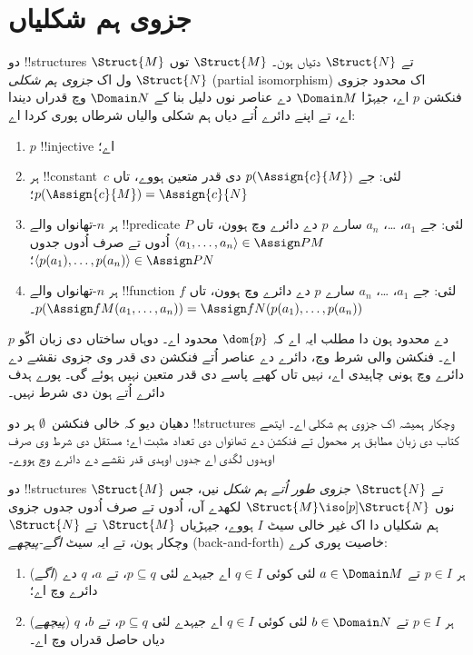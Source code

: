 \documentclass[../../../include/open-logic-section]{subfiles}
\begin{document}
\section{جزوی ہم شکلیاں}

\begin{defn}
  دو !!{structure}s $\Struct{M}$ تے $\Struct{N}$ دتیاں ہون۔
  $\Struct{M}$ توں $\Struct{N}$ ول اک \emph{جزوی ہم شکلی}
  (partial isomorphism) اک محدود جزوی فنکشن $p$ اے، جیہڑا
  $\Domain M$ دے عناصر نوں دلیل بنا کے $\Domain N$ وچ قدراں دیندا
  اے، تے اپنے دائرے اُتے  دیاں
  ہم شکلی والیاں شرطاں پوری کردا اے:
  \begin{enumerate}
  \item $p$ !!{injective} اے؛
  \item ہر !!{constant}~$c$ لئی: جے $p(\Assign{c}{M})$ دی قدر
    متعین ہووے، تاں $p(\Assign{c}{M}) = \Assign{c}{N}$؛
  \item ہر $n$-تھانواں والے !!{predicate} $P$ لئی: جے $a_1$، \dots، $a_n$
    سارے $p$ دے دائرے وچ ہوون، تاں $\langle a_1, \dots, a_n\rangle \in
    \Assign P M$ اُدوں تے صرف اُدوں جدوں $\langle p(a_1), \dots, p(a_n) \rangle
    \in \Assign P N$؛
  \item ہر $n$-تھانواں والے !!{function} $f$ لئی: جے $a_1$، \dots، $a_n$
    سارے $p$ دے دائرے وچ ہوون، تاں $p(\Assign f M (a_1, \dots,a_n))
    = \Assign f N (p(a_1), \dots, p(a_n))$۔
  \end{enumerate}
  $p$ دے محدود ہون دا مطلب ایہ اے کہ $\dom{p}$ محدود اے۔
  دوہاں ساختاں دی زبان اکّو اے۔ فنکشن والی شرط وچ، دائرے دے عناصر
  اُتے فنکشن دی قدر وی جزوی نقشے دے دائرے وچ ہونی چاہیدی اے، نہیں تاں
  کھبے پاسے دی قدر متعین نہیں ہوئے گی۔ پورے ہدف دائرے اُتے ہون دی شرط نہیں۔
\end{defn}

دھیان دیو کہ خالی فنکشن~$\emptyset$ ہر دو !!{structure}s وچکار
ہمیشہ اک جزوی ہم شکلی اے۔
ایتھے کتاب دی زبان مطابق ہر محمول تے فنکشن دے تھانواں دی تعداد مثبت اے؛
مستقل دی شرط وی صرف اوہدوں لگدی اے جدوں اوہدی قدر نقشے دے دائرے وچ ہووے۔

\begin{defn}
  دو !!{structure}s $\Struct{M}$ تے $\Struct{N}$
  \emph{جزوی طور اُتے ہم شکل} نیں، جس نوں $\Struct{M} \iso[p]
  \Struct{N}$ لکھدے آں، اُدوں تے صرف اُدوں جدوں جزوی ہم شکلیاں
  دا اک غیر خالی سیٹ $I$ ہووے، جیہڑیاں $\Struct{M}$ تے $\Struct{N}$
  وچکار ہون، تے ایہ سیٹ \emph{اگے-پیچھے} (back-and-forth) خاصیت پوری کرے:
  \begin{enumerate}
  \item (\emph{اگے}) ہر $p \in I$ تے $a \in \Domain M$ لئی
    کوئی $q \in I$ اے جیہدے لئی $p \subseteq q$، تے $a$،
    $q$ دے دائرے وچ اے؛
  \item (\emph{پیچھے}) ہر $p \in I$ تے $b \in \Domain N$ لئی
    کوئی $q \in I$ اے جیہدے لئی $p \subseteq q$، تے $b$،
    $q$ دیاں حاصل قدراں وچ اے۔
  \end{enumerate}
\end{defn}
\end{document}
